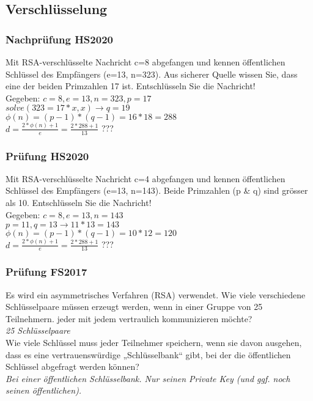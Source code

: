 \subsection{Verschlüsselung}
\subsubsection{Nachprüfung HS2020}
Mit RSA-verschlüsselte Nachricht c=8 abgefangen und kennen öffentlichen Schlüssel des Empfängers (e=13, n=323).
Aus sicherer Quelle wissen Sie, dass eine der beiden Primzahlen 17 ist. Entschlüsseln Sie die Nachricht!\\
Gegeben: $c=8, e=13, n=323, p=17$\\
$solve(323=17*x,x) \rightarrow q=19$\\
$\phi(n) = (p-1)*(q-1) = 16*18=288$\\
$d=\frac{2*\phi(n)+1}{e}=\frac{2*288+1}{13}$
???

\subsubsection{Prüfung HS2020}
Mit RSA-verschlüsselte Nachricht c=4 abgefangen und kennen öffentlichen Schlüssel des Empfängers (e=13, n=143).
Beide Primzahlen (p \& q) sind grösser als 10. Entschlüsseln Sie die Nachricht!\\
Gegeben: $c=8, e=13, n=143$\\
$p=11, q=13 \rightarrow 11*13 = 143$\\
$\phi(n) = (p-1)*(q-1) = 10*12=120$\\
$d=\frac{2*\phi(n)+1}{e}=\frac{2*288+1}{13}$
???

\subsubsection{Prüfung FS2017}
Es wird ein asymmetrisches Verfahren (RSA) verwendet. Wie viele verschiedene Schlüsselpaare müssen erzeugt werden, wenn in einer Gruppe von 25 Teilnehmern. jeder mit jedem vertraulich kommunizieren möchte?\\
\textit{25 Schlüsselpaare}\\

Wie viele Schlüssel muss jeder Teilnehmer speichern, wenn sie davon ausgehen, dass es eine vertrauenswürdige „Schlüsselbank“ gibt, bei der die öffentlichen Schlüssel abgefragt werden können?\\
\textit{Bei einer öffentlichen Schlüsselbank. Nur seinen Private Key (und ggf. noch seinen öffentlichen).}\\

